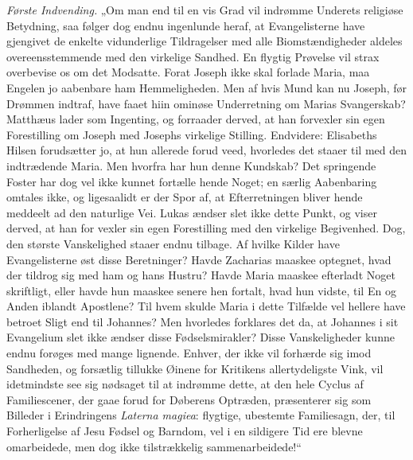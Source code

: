 \documentclass[12pt,a4paper]{book}
\begin{document}
\emph{Første Indvending.} „Om man end til en vis Grad vil indrømme Underets
religiøse Betydning, saa følger dog endnu ingenlunde heraf, at Evangelisterne
have gjengivet de enkelte vidunderlige Tildragelser med alle Biomstændigheder
aldeles overeensstemmende med den virkelige Sandhed. En flygtig Prøvelse vil
strax overbevise os om det Modsatte. Forat Joseph ikke skal forlade Maria, maa
Engelen jo aabenbare ham Hemmeligheden. Men af hvis Mund kan nu Joseph, før
Drømmen indtraf, have faaet hiin ominøse Underretning om Marias Svangerskab?
Matthæus lader som Ingenting, og forraader derved, at han forvexler sin egen
Forestilling om Joseph med Josephs virkelige Stilling. Endvidere: Elisabeths
Hilsen forudsætter jo, at hun allerede forud veed, hvorledes det staaer til med
den indtrædende Maria. Men hvorfra har hun denne Kundskab? Det springende Foster
har dog vel ikke kunnet fortælle hende Noget; en særlig Aabenbaring omtales
ikke, og ligesaalidt er der Spor af, at Efterretningen bliver hende meddeelt ad
den naturlige Vei. Lukas ændser slet ikke dette Punkt, og viser derved, at han
for\-%
vexler sin egen Forestilling med den virkelige Begivenhed. Dog, den største
Vanskelighed staaer endnu tilbage. Af hvilke Kilder have Evangelisterne øst
disse Beretninger? Havde Zacharias maaskee optegnet, hvad der tildrog sig med
ham og hans Hustru? Havde Maria maaskee efterladt Noget skriftligt, eller havde
hun maaskee senere hen fortalt, hvad hun vidste, til En og Anden iblandt
Apostlene? Til hvem skulde Maria i dette Tilfælde vel hellere have betroet Sligt
end til Johannes? Men hvorledes forklares det da, at Johannes i sit Evangelium
slet ikke ændser disse Fødselsmirakler? Disse Vanskeligheder kunne endnu forøges
med mange lignende. Enhver, der ikke vil forhærde sig imod Sandheden, og
forsætlig tillukke Øinene for Kritikens allertydeligste Vink, vil idetmindste
see sig nødsaget til at indrømme dette, at den hele Cyclus af Familiescener, der
gaae forud for Døberens Optræden, præsenterer sig som Billeder i Erindringens
\textit{Laterna magiea}: flygtige, ubestemte Familiesagn, der, til Forherligelse
af Jesu Fødsel og Barndom, vel i en sildigere Tid ere blevne omarbeidede, men
dog ikke tilstrækkelig sammenarbeidede!“
\end{document}
